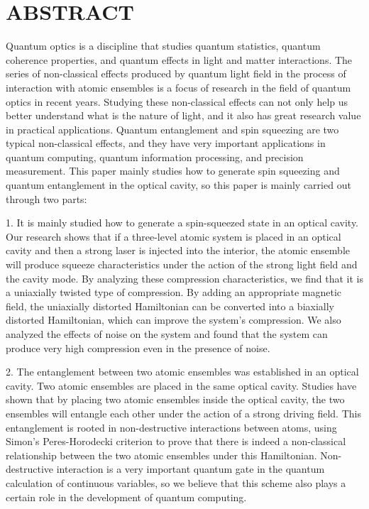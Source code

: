 \vskip 3cm
\section*{\qquad\qquad\qquad\qquad\qquad\quad\quad ABSTRACT}
\vskip 2cm


{
	\par
	\linespread{1.5}\selectfont
	
	 Quantum optics is a discipline that studies quantum statistics, quantum coherence properties, and quantum effects in light and matter  interactions. The series of non-classical effects produced by quantum  light field in the process of interaction with atomic ensembles is a focus of research in the field of quantum optics in recent years. Studying these non-classical effects can not only help us better understand what is the nature of light, and it also has great research value in practical applications. Quantum entanglement and spin squeezing are two typical non-classical effects, and they have very important applications in quantum computing, quantum information processing, and precision measurement. This paper mainly studies how to generate spin squeezing and quantum entanglement in the optical cavity, so this paper is mainly carried out through two parts:
	  
	  
	
	1. It is mainly studied how to generate a spin-squeezed state in an optical cavity. Our research shows that if a three-level atomic system is placed in an optical cavity and then a strong laser is injected into the interior, the atomic ensemble will produce squeeze characteristics under the action of the strong light field and the cavity mode. By analyzing these compression characteristics, we find that it is a uniaxially twisted type of compression. By adding an appropriate magnetic field, the uniaxially distorted Hamiltonian can be converted into a biaxially distorted Hamiltonian, which can improve the system's compression. We also analyzed the effects of noise on the system and found that the system can produce very high compression even in the presence of noise.
	
	2. The entanglement between two atomic ensembles was established in an optical cavity. Two atomic ensembles are placed in the same optical cavity. Studies have shown that by placing two atomic ensembles inside the optical cavity, the two ensembles will entangle each other under the action of a strong driving field. This entanglement is rooted in non-destructive interactions between atoms, using Simon's Peres-Horodecki criterion to prove that there is indeed a non-classical relationship between the two atomic ensembles under this Hamiltonian. Non-destructive interaction is a very important quantum gate in the quantum calculation of continuous variables, so we believe that this scheme also plays a certain role in the development of quantum computing.
	\par


\vbox{}
}
